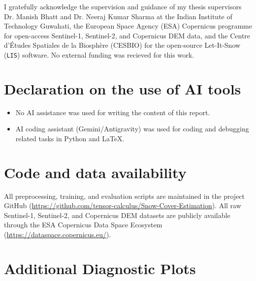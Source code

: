 \documentclass{article}
\newif\ifshowguide
\newcommand{\guide}[1]{%
  \ifshowguide
    \par\medskip\noindent
    \fcolorbox{blue!50}{blue!4}{%
      \begin{minipage}{\dimexpr\linewidth-2\fboxsep-2\fboxrule\relax}
        \small\color{blue!55!black}\textbf{Guidance.} #1
      \end{minipage}}%
    \par\medskip
  \fi}
\begin{document}

\begin{ack}
I gratefully acknowledge the supervision and guidance of my thesis supervisors Dr. Manish Bhatt and Dr. Neeraj Kumar Sharma at the Indian Institute of Technology Guwahati, the European Space Agency (ESA) Copernicus programme for open-access Sentinel-1, Sentinel-2, and Copernicus DEM data, and the Centre d'\'Etudes Spatiales de la Biosph\`ere (CESBIO) for the open-source Let-It-Snow (\texttt{LIS}) software. No external funding was recieved for this work.
\end{ack}

\section*{Declaration on the use of AI tools}
\guide{Mandatory. State which AI tools (e.g., chatbots, code assistants,
writing tools) you used and for what (e.g., coding help, language editing,
literature search). If none, write ``No AI tools were used.'' You remain
responsible for every statement, citation and number in this report; check
every AI-suggested reference exists.}
\begin{itemize}
    \item No AI assistance was used for writing the content of this report.
    \item AI coding assistant (Gemini/Antigravity) was used for coding and debugging related tasks in Python and \LaTeX.
\end{itemize}

\section*{Code and data availability}
All preprocessing, training, and evaluation scripts are maintained in the project GitHub (\url{https://github.com/tensor-calculus/Snow-Cover-Estimation}). All raw Sentinel-1, Sentinel-2, and Copernicus DEM datasets are publicly available through the ESA Copernicus Data Space Ecosystem (\url{https://dataspace.copernicus.eu/}).




\appendix

\section{Additional Diagnostic Plots}
\guide{Optional. Extra figures, tables, derivations or hyperparameter details.
The main text must stand on its own; evaluators are not required to read the
appendix.}
\end{document}
